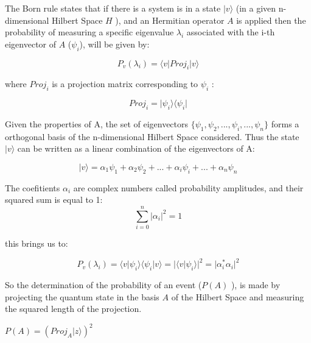 The Born rule states that if there is a system is in a state $\vert v \rangle$  (in a given n-dimensional Hilbert Space $H$ ), and an Hermitian operator $A$ is applied then the probability of measuring a specific eigenvalue $\lambda_{i}$ associated with the i-th eigenvector of $A$ ($\psi_{i}$), will be given by\cite{VanRijsbergen2004}: 


\begin{equation}
\label{eq_born_rule}
P_{v}(\lambda_{i}) = \langle v\vert Proj_{i}\vert v\rangle
\end{equation}

where $Proj_{i}$ is a projection matrix corresponding to $\psi_{i}$ :

 \begin{equation}
\label{eq_born_rule_1}
Proj_{i} = \vert\psi_{i}\rangle \langle \psi_{i}\vert
\end{equation}

Given the properties of A, the set of eigenvectors $\{ \psi_{1}, \psi_{2}, ..., \psi_{i},..., \psi_{n}\}$ forms a orthogonal basis of the n-dimensional Hilbert Space considered. Thus the state $\vert v \rangle$
can be written as a linear combination of the eigenvectors of A:

 \begin{equation}
\label{eq_born_rule_lala}
\vert v \rangle = \alpha_{1}\psi_{1}+ \alpha_{2}\psi_{2}+ ...+\alpha_{i}\psi_{i}+...+\alpha_{n}\psi_{n}
\end{equation}

The coefitients $\alpha_{i}$ are complex numbers called probability amplitudes, and their squared sum is equal to 1: 
\begin{equation}
\sum_{i=0}^{n} \vert \alpha_{i}\vert^{2} = 1
\end{equation}

this brings us to: 

\begin{equation}
\label{eq_born_rule_2}
P_{v}(\lambda_{i}) =\langle v\vert\psi_{i}\rangle\langle\psi_{i}\vert v\rangle=\vert\langle v\vert\psi_{i}\rangle \vert^{2} = \vert \alpha_{i}^{*}\alpha_{i}\vert^{2}
\end{equation}

So the determination of the probability of an event ($P(A)$ ),
is made by projecting the quantum state in the basis $A$ of the
Hilbert Space and measuring the squared length of the projection.\cite{Trueblood}

$P(A)=\left(Proj_{A}\vert z\rangle\right)^{2}$ 

